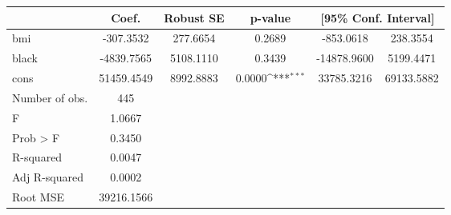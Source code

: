 {
\def\sym#1{\ifmmode^{#1}\else\(^{#1}\)\fi}
\begin{tabular}{l*{1}{ccccc}}
\toprule
            &       Coef.&   Robust SE&     p-value         &\multicolumn{2}{c}{[95\% Conf. Interval]}            \\
\midrule
bmi         &   -307.3532&    277.6654&      0.2689         &   -853.0618&    238.3554\\
black       &  -4839.7565&   5108.1110&      0.3439         & -14878.9600&   5199.4471\\
cons        &  51459.4549&   8992.8883&      0.0000\sym{***}&  33785.3216&  69133.5882\\
\midrule
Number of obs.&         445&            &                     &            &            \\
F           &      1.0667&            &                     &            &            \\
Prob > F    &      0.3450&            &                     &            &            \\
R-squared   &      0.0047&            &                     &            &            \\
Adj R-squared&      0.0002&            &                     &            &            \\
Root MSE    &  39216.1566&            &                     &            &            \\
\bottomrule
\end{tabular}
}
